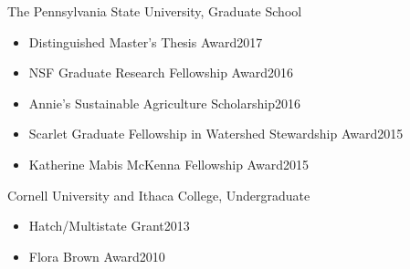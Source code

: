 \documentclass[10pt]{article}
\newenvironment{innerlist}[1][\enskip\textbullet]%
        {\begin{itemize}[#1,leftmargin=*,parsep=0pt,itemsep=0pt,topsep=0pt,partopsep=0pt]}
        {\end{itemize}}
\newcommand{\halfblankline}{\quad\vspace{-0.5\baselineskip}\pagebreak[3]}
\begin{document}
\halfblankline

The Pennsylvania State University, Graduate School
\begin{innerlist}
\item Distinguished Master's Thesis Award\hfill 2017
\item NSF Graduate Research Fellowship Award\hfill 2016
\item Annie's Sustainable Agriculture Scholarship\hfill 2016
\item Scarlet Graduate Fellowship in Watershed Stewardship Award\hfill 2015
\item Katherine Mabis McKenna Fellowship Award\hfill 2015
\end{innerlist}

\halfblankline

Cornell University and Ithaca College, Undergraduate
\begin{innerlist}
\item Hatch/Multistate Grant\hfill 2013
\item Flora Brown Award\hfill 2010
\end{innerlist}
\end{document}
